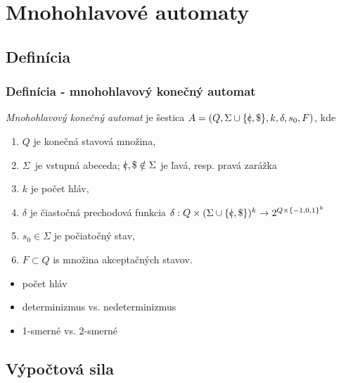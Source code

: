 \documentclass[slovak]{beamer}
\begin{document}
\section{Mnohohlavové automaty}

\subsection{Definícia}

\begin{frame}
\frametitle{Definícia - mnohohlavový konečný automat \cite{hkm}}

\begin{definition}
\emph{Mnohohlavový konečný automat} je šestica $A = (Q, \Sigma \cup \{ \vertcent , \$ \} , k, \delta , s_{0}, F)$, kde 
\begin{enumerate}
\item $Q$ je konečná stavová množina,
\item $\Sigma $\ je vstupná abeceda; $\vertcent , \$ \notin \Sigma $ je ľavá, resp. pravá zarážka 
\item $k$ je počet hláv,
\item $\delta$ je čiastočná prechodová funkcia $\delta : Q \times (\Sigma \cup \{ \vertcent , \$ \} )^k\to 2^{Q \times \{ -1, 0, 1\} ^k}$
\item $s_{0} \in \Sigma $ je počiatočný stav,
\item $F \subset Q$ is množina akceptačných stavov.
\end{enumerate}
\end{definition}

\begin{itemize}
\item počet hláv
\item determinizmus vs. nedeterminizmus
\item 1-smerné vs. 2-smerné
\end{itemize}

\end{frame}

\subsection{Výpočtová sila}
\end{document}
